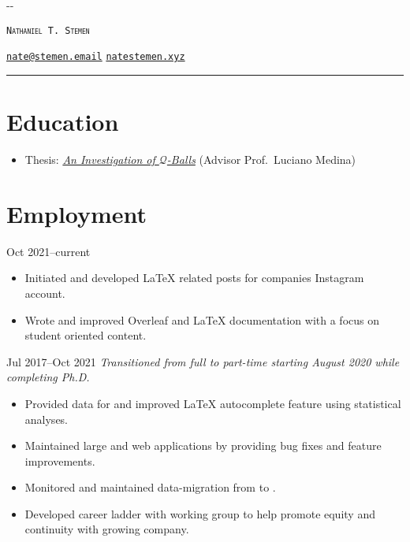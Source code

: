 \documentclass{cultvoucher}
\begin{document}
\thispagestyle{firststyle}

\begin{adjustwidth}{\dimexpr-\marginparsep-\marginparwidth}{}
	\begin{center}
		{\Huge \textsc{\texttt{Nathaniel T. Stemen}}\par}
		\href{mailto:nate@stemen.email}{\texttt{nate@stemen.email}} \textbullet{}
		\href{https://natestemen.xyz}{\texttt{natestemen.xyz}}
		\rule{\dimexpr\textwidth+\marginparsep+\marginparwidth}{0.4pt}\par
	\end{center}
\end{adjustwidth}

\section{Education}

\begin{itemize}
	\vspace{-0.25em}
	\item Thesis: \href{https://natestemen.xyz/qv-thesis.pdf}{\textit{An Investigation of $\mathcal{Q}$-Balls}} (Advisor Prof.\ Luciano Medina)
\end{itemize}

\section{Employment}
{Oct 2021--current}
\begin{itemize}
	\vspace{-0.25em}
	\item Initiated and developed \LaTeX{} related posts for companies Instagram account.
	\item Wrote and improved Overleaf and \LaTeX{} documentation with a focus on student oriented content.
\end{itemize}
{Jul 2017--Oct 2021}
\vspace{-0.25em}
\emph{Transitioned from full to part-time starting August 2020 while completing Ph.D.}
\begin{itemize}
	\vspace{-0.25em}
	\item Provided data for and improved \LaTeX{} autocomplete feature using statistical analyses.
	\item Maintained large  and  web applications by providing bug fixes and feature improvements.
	\item Monitored and maintained data-migration from  to .
	\item Developed career ladder with working group to help promote equity and continuity with growing company.
\end{itemize}
\end{document}
